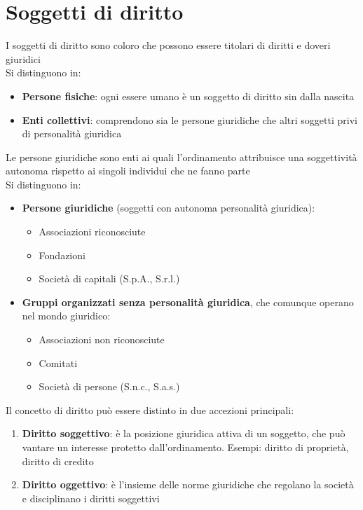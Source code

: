 \documentclass[8pt,oneside,a4paper]{article}
\begin{document}
	\section{Soggetti di diritto}
	I soggetti di diritto sono coloro che possono essere titolari di diritti e doveri giuridici\\
	Si distinguono in:  
	\begin{itemize}
		\item \textbf{Persone fisiche}: ogni essere umano è un soggetto di diritto sin dalla nascita
		\item \textbf{Enti collettivi}: comprendono sia le persone giuridiche che altri soggetti privi di personalità giuridica  
	\end{itemize}
	Le persone giuridiche sono enti ai quali l'ordinamento attribuisce una soggettività autonoma rispetto ai singoli individui che ne fanno parte\\
	Si distinguono in:  
	\begin{itemize}
		\item \textbf{Persone giuridiche} (soggetti con autonoma personalità giuridica):  
		\begin{itemize}
			\item Associazioni riconosciute  
			\item Fondazioni  
			\item Società di capitali (S.p.A., S.r.l.)  
		\end{itemize}
		\item \textbf{Gruppi organizzati senza personalità giuridica}, che comunque operano nel mondo giuridico:  
		\begin{itemize}
			\item Associazioni non riconosciute  
			\item Comitati  
			\item Società di persone (S.n.c., S.a.s.)  
		\end{itemize}
	\end{itemize}
	Il concetto di diritto può essere distinto in due accezioni principali:  
	\begin{enumerate}
		\item \textbf{Diritto soggettivo}: è la posizione giuridica attiva di un soggetto, che può vantare un interesse protetto dall'ordinamento. Esempi: diritto di proprietà, diritto di credito 
		\item \textbf{Diritto oggettivo}: è l'insieme delle norme giuridiche che regolano la società e disciplinano i diritti soggettivi
	\end{enumerate}
\end{document}
